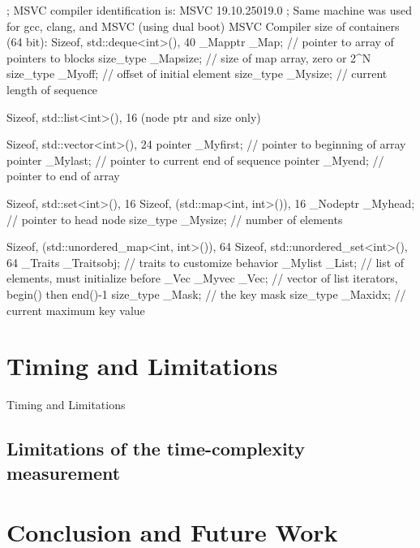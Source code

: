 \documentclass{sig-alternate}
\begin{document}
; MSVC compiler identification is:  MSVC 19.10.25019.0
; Same machine was used for gcc, clang, and MSVC (using dual boot)
MSVC Compiler size of containers (64 bit):
Sizeof, std::deque<int>(), 40
	_Mapptr _Map;		// pointer to array of pointers to blocks
	size_type _Mapsize;	// size of map array, zero or 2^N
	size_type _Myoff;	// offset of initial element
	size_type _Mysize;	// current length of sequence


Sizeof, std::list<int>(), 16
 (node ptr and size only)

Sizeof, std::vector<int>(), 24
	pointer _Myfirst;	// pointer to beginning of array
	pointer _Mylast;	// pointer to current end of sequence
	pointer _Myend;	// pointer to end of array

Sizeof, std::set<int>(), 16
Sizeof, (std::map<int, int>()), 16
	_Nodeptr _Myhead;	// pointer to head node
	size_type _Mysize;	// number of elements


Sizeof, (std::unordered_map<int, int>()), 64
Sizeof, std::unordered_set<int>(), 64
	_Traits _Traitsobj;	// traits to customize behavior
	_Mylist _List;	// list of elements, must initialize before _Vec
	_Myvec _Vec;	// vector of list iterators, begin() then end()-1
	size_type _Mask;	// the key mask
	size_type _Maxidx;	// current maximum key value


\section{Timing and Limitations}
Timing and Limitations
\subsection{Limitations of the time-complexity measurement}

\section{Conclusion and Future Work}


{\small

}
\end{document}
